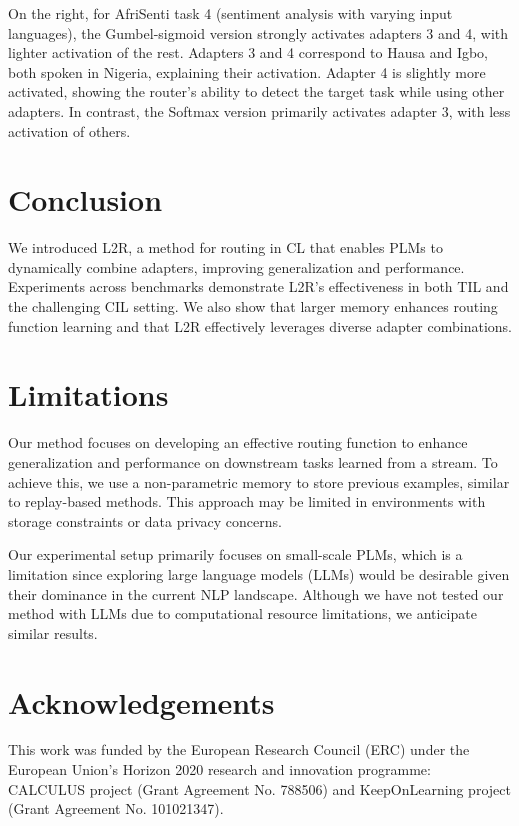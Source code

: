 \documentclass[11pt]{article}
\begin{document}
On the right, for AfriSenti task 4 (sentiment analysis with varying input languages), the Gumbel-sigmoid version strongly activates adapters 3 and 4, with lighter activation of the rest. Adapters 3 and 4 correspond to Hausa and Igbo, both spoken in Nigeria, explaining their activation. Adapter 4 is slightly more activated, showing the router’s ability to detect the target task while using other adapters. In contrast, the Softmax version primarily activates adapter 3, with less activation of others.


\section{Conclusion}
We introduced L2R, a method for routing in CL that enables PLMs to dynamically combine adapters, improving generalization and performance. Experiments across benchmarks demonstrate L2R's effectiveness in both TIL and the challenging CIL setting. We also show that larger memory enhances routing function learning and that L2R effectively leverages diverse adapter combinations.

\section*{Limitations}
Our method focuses on developing an effective routing function to enhance generalization and performance on downstream tasks learned from a stream. To achieve this, we use a non-parametric memory to store previous examples, similar to replay-based methods. This approach may be limited in environments with storage constraints or data privacy concerns.

Our experimental setup primarily focuses on small-scale PLMs, which is a limitation since exploring large language models (LLMs) would be desirable given their dominance in the current NLP landscape. Although we have not tested our method with LLMs due to computational resource limitations, we anticipate similar results.

\section{Acknowledgements}

This work was funded by the European Research Council (ERC) under the European Union’s Horizon 2020 research and innovation programme: CALCULUS project (Grant Agreement No. 788506) and KeepOnLearning project (Grant Agreement No. 101021347).


\end{document}
